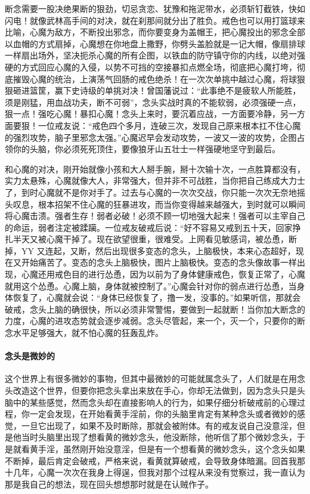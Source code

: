 断念需要一股决绝果断的狠劲，切忌贪恋、犹豫和拖泥带水，必须斩钉截铁，快如闪电！就像武林高手间的对决，就在刹那间就分出了胜负。戒色也可以用打篮球来比喻，心魔为敌方，不断投出邪念，而你要变身为盖帽王，把心魔投出的邪念全部以血帽的方式扇掉，心魔想在你地盘上撒野，你劈头盖脸就是一记大帽，像扇排球一样扇出场外，坚决扼杀心魔的所有企图，以铁血的防守镇守你的内线，以绝对强硬的方式回应心魔的入侵，以势不可挡的空接暴扣点燃全场，彻底把心魔打垮，彻底摧毁心魔的统治，上演荡气回肠的戒色绝杀！在一次次单挑中越过心魔，将球狠狠砸进篮筐，赢下史诗级的单挑对决！曾国藩说过：“此事绝不是疲软人所能胜，须是刚猛，用血战功夫，断不可弱”，念头实战时真的不能软弱，必须强硬一点，狠一点！强吃心魔！暴扣心魔！念头上来时，要沉着应战，一方面要冷静，另一方面要狠！一位戒友说：“戒色四个多月，连破三次，发现自己原来根本扛不住心魔的强烈攻势，脑子里邪念太强。”心魔迟早会发动攻势，一波又一波的攻势，企图占领你的头脑，你必须死死顶住，要像狼牙山五壮士一样强硬地坚守到最后。

和心魔的对决，刚开始就像小孩和大人掰手腕，掰十次输十次，一点胜算都没有，实力太悬殊，心魔就像大人，非常强大，但并非不可战胜，当你把自己练成大力士了，到时心魔就不是你对手了。过去与心魔的一次次交战，你只能一次次无奈地摇头叹息，根本招架不住心魔的狂暴进攻，而当你变得越来越强大，到时就可以瞬间将心魔击溃。强者生存！弱者必破！必须不顾一切地强大起来！强者可以主宰自己的命运，弱者注定被蹂躏。一位戒友破戒后说：“好不容易又戒到五十天，回家挣扎半天又被心魔干掉了。现在欲望很重，很难受。上网看见敏感词，被怂恿，断掉，YY 又连起，又断，然后出现很多变态的念头，上脑极快，本来心态超好，现在又开始痛苦了。变态的念头上脑极快，图片上脑极快。变态的念头像故事一样出现，心魔还用戒色目的进行怂恿，因为以前为了身体健康戒色，恢复正常了，心魔就用这个怂恿。心魔上脑，身体就被控制了。”心魔会针对你的弱点进行怂恿，当身体恢复了，心魔就会说：“身体已经恢复了，撸一发，没事的。”如果听信，那就会破戒，念头上脑的确很快，所以必须非常警惕，要做到一起就断！当你加大断念的力度，心魔的进攻态势就会逐步减弱。念头尽管起，来一个，灭一个，只要你的断念水平足够强大，就不怕心魔的狂轰乱炸。

\paragraph{念头是微妙的}

这个世界上有很多微妙的事物，但其中最微妙的可能就属念头了，人们就是在用念头改造这个世界，但要你把念头拿出来放在手心，你却无法做到，因为念头只是头脑中的某些感觉，然而念头却在直接影响人的行为，如果仔细分析破戒前的心理过程，你一定会发现，在开始看黄手淫前，你的头脑里肯定有某种念头或者微妙的感觉，一旦它出现了，如果不及时断除，那就会被附体。有的戒友说自己没意淫，但是他当时头脑里出现了想看黄的微妙念头，他没断除，他听信了那个微妙念头，于是就看黄手淫，虽然刚开始没意淫，但是有一个想看黄的微妙念头，这个念头如果不断掉，最后肯定会破戒，严格来说，看黄就算破戒，会导致身体暗漏。回首我那十几年，心魔一次次在我身上得逞，但我对那个过程从来没有觉察过，我一直认为那是我自己的想法，现在回头想想那时就是在认贼作子。

